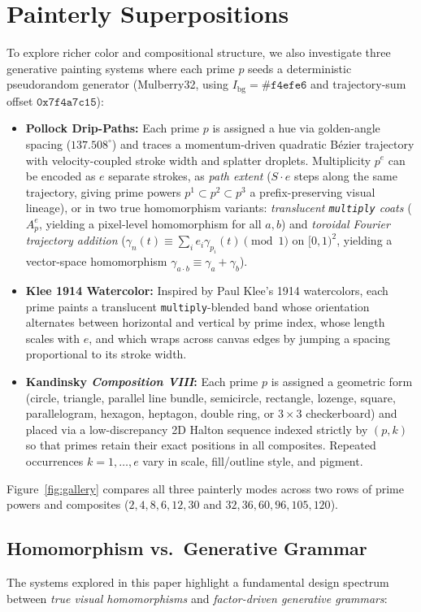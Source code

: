 \documentclass[]{interact}
\theoremstyle{plain}
\theoremstyle{definition}
\theoremstyle{remark}
\begin{document}
\section{Painterly Superpositions}
To explore richer color and compositional structure, we also investigate three generative painting systems where each prime $p$ seeds a deterministic pseudorandom generator (Mulberry32, using $I_{\mathrm{bg}} = \texttt{\#f4efe6}$ and trajectory-sum offset $\texttt{0x7f4a7c15}$):
\begin{itemize}
  \item \textbf{Pollock Drip-Paths:} Each prime $p$ is assigned a hue via golden-angle spacing ($137.508^\circ$) and traces a momentum-driven quadratic B\'ezier trajectory with velocity-coupled stroke width and splatter droplets. Multiplicity $p^e$ can be encoded as $e$ separate strokes, as \emph{path extent} ($S \cdot e$ steps along the same trajectory, giving prime powers $p^1 \subset p^2 \subset p^3$ a prefix-preserving visual lineage), or in two true homomorphism variants: \emph{translucent \texttt{multiply} coats} ($A_p^e$, yielding a pixel-level homomorphism for all $a,b$) and \emph{toroidal Fourier trajectory addition} ($\gamma_n(t) \equiv \sum_i e_i \gamma_{p_i}(t) \pmod{1}$ on $[0,1)^2$, yielding a vector-space homomorphism $\gamma_{a\cdot b} \equiv \gamma_a + \gamma_b$).
  \item \textbf{Klee 1914 Watercolor:} Inspired by Paul Klee's 1914 watercolors, each prime paints a translucent \texttt{multiply}-blended band whose orientation alternates between horizontal and vertical by prime index, whose length scales with $e$, and which wraps across canvas edges by jumping a spacing proportional to its stroke width.
  \item \textbf{Kandinsky \emph{Composition VIII}:} Each prime $p$ is assigned a geometric form (circle, triangle, parallel line bundle, semicircle, rectangle, lozenge, square, parallelogram, hexagon, heptagon, double ring, or $3\times 3$ checkerboard) and placed via a low-discrepancy 2D Halton sequence indexed strictly by $(p, k)$ so that primes retain their exact positions in all composites. Repeated occurrences $k=1,\dots,e$ vary in scale, fill/outline style, and pigment.
\end{itemize}
Figure~\ref{fig:gallery} compares all three painterly modes across two rows of prime powers and composites ($2, 4, 8, 6, 12, 30$ and $32, 36, 60, 96, 105, 120$).

\subsection{Homomorphism vs.\ Generative Grammar}
The systems explored in this paper highlight a fundamental design spectrum between \emph{true visual homomorphisms} and \emph{factor-driven generative grammars}:
\end{document}
